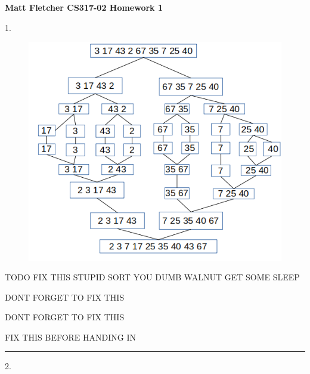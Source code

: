 \documentclass{article}
\begin{document}
	

\thispagestyle{empty}

\let\oldemptyset\emptyset
\let\emptyset\varnothing


\newcommand*{\Perm}[2]{{}^{#1}\!P_{#2}}
\newcommand*{\Comb}[2]{{}_{#1}C_{#2}}


	
\textbf{	Matt Fletcher CS317-02 Homework 1}
\smallskip


1.  


\begin{figure}[H]
\includegraphics[scale=0.5]{./P1/sorted}
\centering
\end{figure}


TODO FIX THIS STUPID SORT YOU DUMB WALNUT GET SOME SLEEP

DONT FORGET TO FIX THIS

DONT FORGET TO FIX THIS

FIX THIS BEFORE HANDING IN

\noindent\rule{8cm}{0.4pt}



2. 
\end{document}
